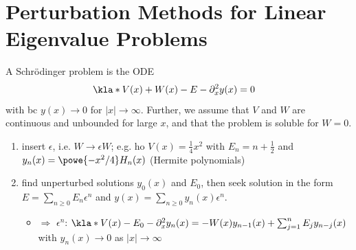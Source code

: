 \documentclass[english, parskip=full]{scrbook}
\newcommand{\definition}[2]{\begin{tcolorbox}[colback=colorbackgrounddefinition,colframe=colordefinition, breakable,enhanced,title=\textbf{#1}.]#2\end{tcolorbox}}
\begin{document}
\section{Perturbation Methods for Linear Eigenvalue Problems}
\definition{Schrödinger Equation}{A Schrödinger problem is the ODE
\begin{align}
\kla*{V(x) + W(x) - E - \partial_x^2} y(x) &= 0
\end{align}
with \gls{bc} $y(x) \rightarrow 0$ for $|x|\rightarrow \infty$.
Further, we assume that $V$ and $W$ are continuous and unbounded for large $x$, and that the problem is soluble for $W=0$.}
\begin{enumerate}
\item insert $\epsilon$, i.e. $W\rightarrow \epsilon W$; e.g. \gls{ho} $V(x)=\frac{1}{4}x^2$ with $E_n= n+\frac{1}{2}$ and $y_n(x) = \powe{-x^2/4} H_n(x)$ (Hermite polynomials)
\item find unperturbed solutions $y_0(x)$ and $E_0$, then seek solution in the form $E=\sum_{n\ge 0} E_n\epsilon^n$ and $y(x) = \sum_{n\ge 0} y_n(x)\epsilon^n$.
\begin{itemize}
\item $\Rightarrow$ $\epsilon^n$: $\kla*{V(x) - E_0 - \partial_x^2}y_n(x) = -W(x)y_{n-1}(x) + \sum_{j=1}^n E_j y_{n-j}(x)$ with $y_n(x) \rightarrow 0$ as $|x|\rightarrow \infty$
\end{itemize}
\end{enumerate}
\end{document}
